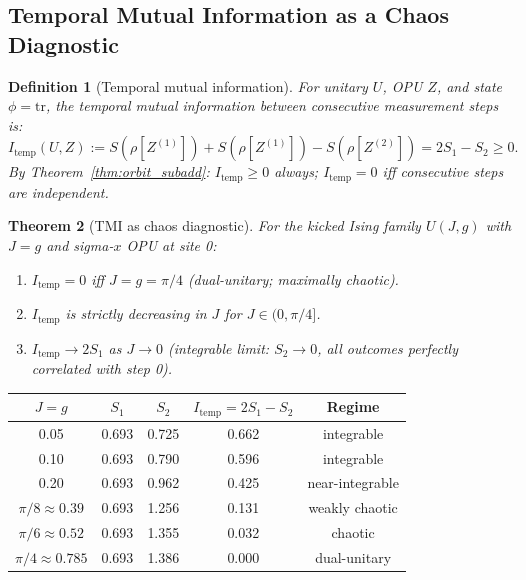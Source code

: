 \documentclass[12pt,a4paper]{article}
\newtheorem{theorem}{Theorem}[section]
\newtheorem{definition}[theorem]{Definition}
\begin{document}
\subsection{Temporal Mutual Information as a Chaos Diagnostic}

\begin{definition}[Temporal mutual information]\label{def:tmi}
For unitary $U$, OPU $Z$, and state $\phi=\mathrm{tr}$, the
\emph{temporal mutual information} between consecutive measurement steps is:
\begin{equation}\label{eq:tmi}
  I_\mathrm{temp}(U,Z) := S(\rho[Z^{(1)}]) + S(\rho[Z^{(1)}]) - S(\rho[Z^{(2)}])
  = 2S_1 - S_2 \ge 0.
\end{equation}
By Theorem~\ref{thm:orbit_subadd}: $I_\mathrm{temp}\ge 0$ always; $I_\mathrm{temp}=0$
iff consecutive steps are independent.
\end{definition}

\begin{theorem}[TMI as chaos diagnostic]\label{thm:tmi_chaos}
For the kicked Ising family $U(J,g)$ with $J=g$ and sigma-$x$ OPU at site 0:
\begin{enumerate}
\item[(a)] $I_\mathrm{temp}=0$ iff $J=g=\pi/4$ (dual-unitary; maximally chaotic).
\item[(b)] $I_\mathrm{temp}$ is strictly decreasing in $J$ for $J\in(0,\pi/4]$.
\item[(c)] $I_\mathrm{temp}\to 2S_1$ as $J\to 0$ (integrable limit: $S_2\to 0$,
  all outcomes perfectly correlated with step 0).
\end{enumerate}
\end{theorem}

\begin{center}
\begin{tabular}{@{}ccccc@{}}
\toprule
$J=g$ & $S_1$ & $S_2$ & $I_\mathrm{temp}=2S_1-S_2$ & Regime \\
\midrule
0.05 & 0.693 & 0.725 & 0.662 & integrable \\
0.10 & 0.693 & 0.790 & 0.596 & integrable \\
0.20 & 0.693 & 0.962 & 0.425 & near-integrable \\
$\pi/8\approx 0.39$ & 0.693 & 1.256 & 0.131 & weakly chaotic \\
$\pi/6\approx 0.52$ & 0.693 & 1.355 & 0.032 & chaotic \\
$\pi/4\approx 0.785$ & 0.693 & 1.386 & 0.000 & dual-unitary \\
\bottomrule
\end{tabular}
\end{center}
\end{document}
